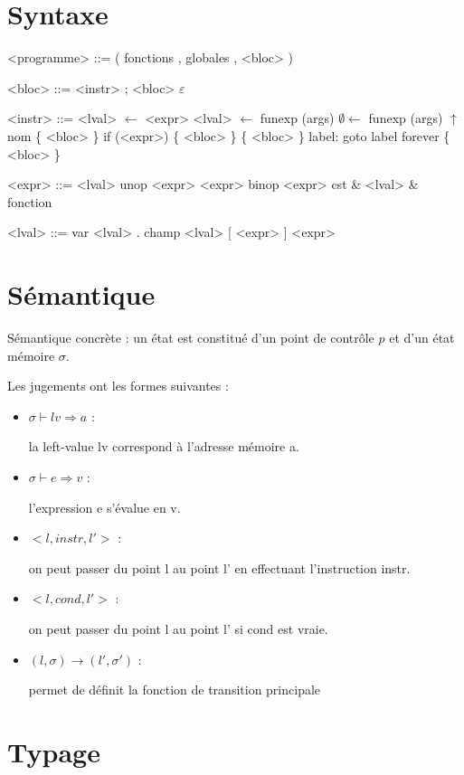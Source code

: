 \documentclass{article}
\begin{document}
\section*{Syntaxe}

\begin{grammar}
<programme> ::= ( fonctions , globales , <bloc> )

     <bloc> ::= <instr> ; <bloc>
           \alt $ε$

    <instr> ::= <lval> $←$ <expr>
           \alt <lval> $←$ funexp (args)
           \alt  $∅ ←$ funexp (args)
           \alt $↑$ nom \{ <bloc> \}
           \alt if (<expr>) \{ <bloc> \}
           \alt \{ <bloc> \} label:
           \alt goto label
           \alt forever \{ <bloc> \}

    <expr> ::= <lval>
          \alt unop <expr>
          \alt <expr> binop <expr>
          \alt cst
          \alt \& <lval>
          \alt \& fonction

    <lval> ::= var
          \alt <lval> . champ
          \alt <lval> [ <expr> ]
          \alt * <expr>

\end{grammar}

\section*{Sémantique}

Sémantique concrète : un état est constitué d'un point de contrôle $p$ et d'un
état mémoire $σ$.

Les jugements ont les formes suivantes :

\begin{itemize}

\item $σ ⊢ lv ⇒ a$ :

  la left-value lv correspond à l'adresse mémoire a.

\item $σ ⊢ e ⇒ v$ :

  l'expression e s'évalue en v.

\item $<l, instr, l'>$ :

  on peut passer du point l au point l' en effectuant
  l'instruction instr.

\item $<l, cond, l'>$ :

  on peut passer du point l au point l' si cond est vraie.

\item $(l, σ) → (l', σ')$ :

  permet de définit la fonction de transition principale

\end{itemize}



\section*{Typage}
\end{document}
